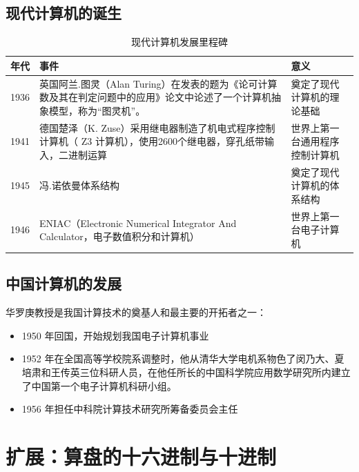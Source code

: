 \documentclass[12pt,UTF8]{ctexbook}
\begin{document}
\section{现代计算机的诞生}

\begin{table}[htbp]
    \centering
    \caption{现代计算机发展里程碑}
    \begin{tabular}{|p{2cm}|p{3.5cm}|p{4.5cm}|}
        \hline
        \textbf{年代} & \textbf{事件} & \textbf{意义} \\
        \hline
        1936 & 英国阿兰.图灵（Alan Turing）在发表的题为《论可计算数及其在判定问题中的应用》论文中论述了一个计算机抽象模型，称为“图灵机”。 & 奠定了现代计算机的理论基础 \\
        \hline
        1941 & 德国楚泽（K. Zuse）采用继电器制造了机电式程序控制计算机（ Z3 计算机），使用2600个继电器，穿孔纸带输入，二进制运算 & 世界上第一台通用程序控制计算机 \\
        \hline
        1945 & 冯.诺依曼体系结构 & 奠定了现代计算机的体系结构 \\
        \hline
        1946 & ENIAC（Electronic Numerical Integrator And Calculator，电子数值积分和计算机） & 世界上第一台电子计算机 \\
        \hline
    \end{tabular}
\end{table}

\section{中国计算机的发展}

华罗庚教授是我国计算技术的奠基人和最主要的开拓者之一：

\begin{itemize}[leftmargin=2cm]
    \item 1950 年回国，开始规划我国电子计算机事业
    \item 1952 年在全国高等学校院系调整时，他从清华大学电机系物色了闵乃大、夏培肃和王传英三位科研人员，在他任所长的中国科学院应用数学研究所内建立了中国第一个电子计算机科研小组。
    \item 1956 年担任中科院计算技术研究所筹备委员会主任
\end{itemize}

\chapter{扩展：算盘的十六进制与十进制}
\label{chap:abacus_extension}
\end{document}
